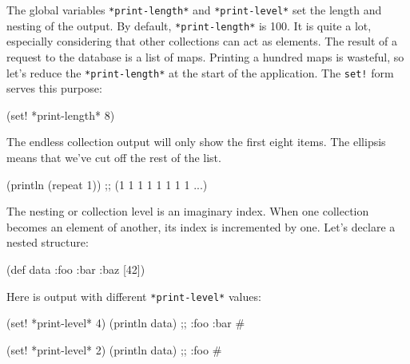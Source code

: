 
The global variables \verb|*print-length*| and \verb|*print-level*| set the length and nesting of the output.
By default, \verb|*print-length*| is 100.
It is quite a lot, especially considering that other collections can act as elements.
The result of a request to the database is a list of maps. Printing a hundred maps is wasteful, so let's reduce the \verb|*print-length*| at the start of the application. The \verb|set!| form serves this purpose:

\begin{english}
  \begin{clojure}
(set! *print-length* 8)
  \end{clojure}
\end{english}

The endless collection output will only show the first eight items. The ellipsis means that we've cut off the rest of the list.

\begin{english}
  \begin{clojure}
(println (repeat 1))
;; (1 1 1 1 1 1 1 1 ...)
  \end{clojure}
\end{english}

The nesting or collection level is an imaginary index.
When one collection becomes an element of another, its index is incremented by one.
Let's declare a nested structure:

\begin{english}
  \begin{clojure}
(def data {:foo
            {:bar
              {:baz [42]}}})
  \end{clojure}
\end{english}

Here is output with different \texttt{*print\--le\-vel*} values:

\ifx\DEVICETYPE\MOBILE

\begin{english}
  \begin{clojure}
(set! *print-level* 4)
(println data)
;; {:foo {:bar #}}
  \end{clojure}

\splitter

  \begin{clojure}
(set! *print-level* 2)
(println data)
;; {:foo #}
  \end{clojure}
\end{english}

